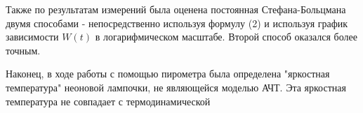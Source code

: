 \documentclass[15pt,a5paper,reqno]{article}
\begin{document}
Также по результатам измерений была оценена постоянная Стефана-Больцмана двумя способами - непосредственно используя формулу (2) и используя график зависимости $W(t)$ в логарифмическом масштабе. Второй способ оказался более точным.


Наконец, в ходе работы с помощью пирометра была определена "яркостная температура" неоновой лампочки, не являющейся моделью АЧТ. Эта яркостная температура не совпадает с термодинамической
\end{document}
